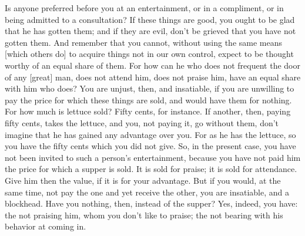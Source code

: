 Is anyone preferred before  you at an entertainment, or in  a compliment, or in
being admitted  to a consultation?  If these things are  good, you ought  to be
glad that he has  gotten them; and if they are evil, don't  be grieved that you
have not  gotten them.  And remember  that you cannot,  without using  the same
means [which others do] to acquire things  not in our own control, expect to be
thought worthy of an equal share of them.  For how can he who does not frequent
the door of any [great] man, does not  attend him, does not praise him, have an
equal share with him who does? You are unjust, then, and insatiable, if you are
unwilling to pay the price for which these things are sold, and would have them
for  nothing. For  how much  is  lettuce sold?  Fifty cents,  for instance.  If
another, then, paying  fifty cents, takes the lettuce, and  you, not paying it,
go without them, don't  imagine that he has gained any  advantage over you. For
as he  has the lettuce,  so you have  the fifty cents  which you did  not give.
So,  in  the present  case,  you  have not  been  invited  to such  a  person's
entertainment, because you  have not paid him  the price for which  a supper is
sold. It  is sold  for praise;  it is sold  for attendance.  Give him  then the
value, if it is for your advantage. But if you would, at the same time, not pay
the one and  yet receive the other,  you are insatiable, and  a blockhead. Have
you  nothing, then,  instead of  the  supper? Yes,  indeed, you  have: the  not
praising him, whom you don't like to  praise; the not bearing with his behavior
at coming in.
